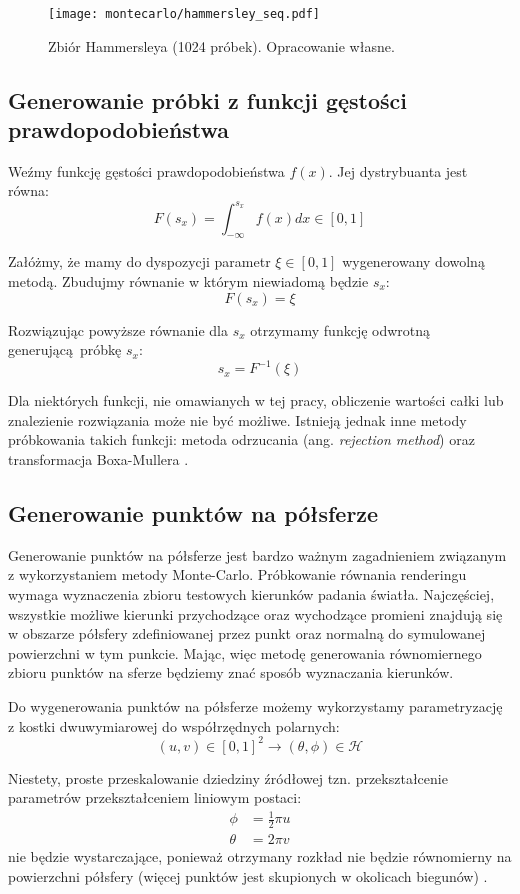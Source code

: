 \documentclass[../main.tex]{subfiles}
\begin{document}
\begin{figure}[h]
  \centering
  \texttt{[image: montecarlo/hammersley\_seq.pdf]}
  \caption{Zbiór Hammersleya (1024 próbek). Opracowanie własne.}
  \label{fig:HammersleySamples}
\end{figure}

\subsection{Generowanie próbki z funkcji gęstości prawdopodobieństwa}
\label{section:pdfsampling}

Weźmy funkcję gęstości prawdopodobieństwa $f(x)$. Jej dystrybuanta jest równa:
\[ 
F(s_x) = \int_{-\infty}^{s_{x}} f(x) dx \in [0,1] 
\]

Załóżmy, że mamy do dyspozycji parametr $\xi \in [0,1]$ wygenerowany dowolną
metodą. Zbudujmy równanie w którym niewiadomą będzie $s_x$:
\[ 
F(s_x) = \xi
\]

Rozwiązując powyższe równanie dla $s_x$ otrzymamy funkcję odwrotną generującą próbkę
$s_x$:
\[
s_x = F^{-1}(\xi)
\]

Dla niektórych funkcji, nie omawianych w tej pracy, obliczenie wartości całki lub znalezienie rozwiązania może nie być możliwe. Istnieją jednak inne metody próbkowania takich funkcji: metoda odrzucania (ang. \textit{rejection method}) oraz transformacja Boxa-Mullera \cite{pbrt}.

\subsection{Generowanie punktów na półsferze}

Generowanie punktów na półsferze jest bardzo ważnym zagadnieniem związanym z wykorzystaniem metody Monte-Carlo. Próbkowanie równania renderingu wymaga wyznaczenia zbioru testowych kierunków padania światła. Najczęściej, wszystkie możliwe kierunki przychodzące oraz wychodzące promieni znajdują się w obszarze półsfery zdefiniowanej przez punkt oraz normalną do symulowanej powierzchni w tym punkcie. Mając, więc metodę generowania równomiernego zbioru punktów na sferze będziemy znać sposób wyznaczania kierunków.

Do wygenerowania punktów na półsferze możemy wykorzystamy parametryzację z kostki dwuwymiarowej do współrzędnych polarnych:
\[
  (u,v) \in [0,1]^2 \rightarrow (\theta, \phi) \in \mathcal{H}
\]

Niestety, proste przeskalowanie dziedziny źródłowej tzn. przekształcenie parametrów przekształceniem liniowym postaci:
\begin{align*}
	\phi &= \frac{1}{2} \pi u \\
 	\theta &= 2 \pi v
\end{align*}
\noindent nie będzie wystarczające, ponieważ otrzymany rozkład nie będzie równomierny na powierzchni półsfery (więcej punktów jest skupionych w okolicach biegunów) \cite{WolframSpherePointPicking}.
\end{document}
